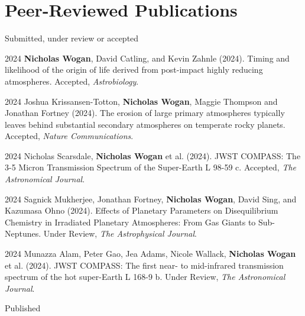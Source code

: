 \documentclass{article}
\begin{document}
\section{Peer-Reviewed Publications}

\noindent Submitted, under review or accepted

\begin{cvlist}
\item[2024]
  \textbf{Nicholas Wogan}, David Catling, and Kevin Zahnle (2024). Timing and likelihood of the origin of life derived from post-impact highly reducing atmospheres. Accepted, \emph{Astrobiology}.
\item[2024]
  Joshua Krissansen-Totton, \textbf{Nicholas Wogan}, Maggie Thompson and Jonathan Fortney (2024). The erosion of large primary atmospheres typically leaves behind substantial secondary atmospheres on temperate rocky planets. Accepted, \emph{Nature Communications}.
\item[2024]
  Nicholas Scarsdale, \textbf{Nicholas Wogan} et al. (2024). JWST COMPASS: The 3-5 Micron Transmission Spectrum of the Super-Earth L 98-59 c. Accepted, \emph{The Astronomical Journal}.
\item[2024]
  Sagnick Mukherjee, Jonathan Fortney, \textbf{Nicholas Wogan}, David Sing, and Kazumasa Ohno (2024). Effects of Planetary Parameters on Disequilibrium Chemistry in Irradiated Planetary Atmospheres: From Gas Giants to Sub-Neptunes. Under Review, \emph{The Astrophysical Journal}.
\item[2024]
  Munazza Alam, Peter Gao, Jea Adams, Nicole Wallack, \textbf{Nicholas Wogan} et al. (2024). JWST COMPASS: The first near- to mid-infrared transmission spectrum of the hot super-Earth L 168-9 b. Under Review, \emph{The Astronomical Journal}.
\end{cvlist}

\noindent Published
\end{document}
